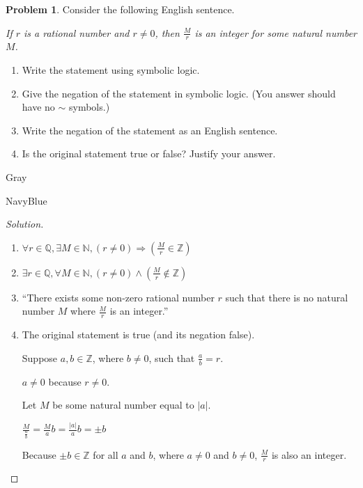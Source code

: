 \documentclass[12pt]{amsart}
\newcounter{problem_number}[section]
\theoremstyle{named}
\newenvironment{soln}
{\begin{color}{Gray}\begin{framed}\begin{color}{NavyBlue}\begin{proof}[Solution]
\doublespacing}
{\end{proof}\end{color}\end{framed}\end{color}}
\theoremstyle{definition}
\newtheorem{problem}{Problem}
\begin{document}
\vspace*{1em}

\begin{problem}
	Consider the following English sentence.
\begin{center}
	\emph{If $r$ is a rational number and $r\not=0$, then $\frac{M}{r}$ is an integer for some natural number $M$.}
\end{center}

	\begin{enumerate}
		\item Write the statement using symbolic logic.
		\item Give the negation of the statement in symbolic logic. (You answer should have no $\sim$ symbols.)
		\item Write the negation of the statement as an English sentence.
		\item Is the original statement true or false? Justify your answer.
	\end{enumerate}
\end{problem}

\begin{soln}
	\phantom{ }
	\begin{enumerate}
		\item $\forall r \in \mathbb Q,\exists M \in \mathbb N,
		(r \neq 0) \Rightarrow  (\frac{M}{r} \in \mathbb Z)$

		\item $\exists r \in \mathbb Q, \forall M \in \mathbb N, (r \neq 0)
		\land (\frac{M}{r} \notin \mathbb Z)$

		\item ``There exists some non-zero rational number $r$ such that there is no
		natural number $M$ where $\frac{M}{r}$ is an integer.''

		\item The original statement is true (and its negation false). 
		
		
		

		\noindent Suppose $a,b \in \mathbb Z$, where $b \neq 0$, such that $\frac{a}{b} = r$.

		\noindent $a \neq 0$ because $r \neq 0$.

		\noindent Let $M$ be some natural number equal to $|a|$.
		
		\noindent $\frac{M}{\frac{a}{b}} = \frac{M}{a}b = \frac{|a|}{a}b = \pm b$

		\noindent Because $\pm b \in \mathbb Z$ for all $a$ and $b$, where $a \neq 0$
		and $b \neq 0$, $\frac{M}{r}$ is also an integer.  
	\end{enumerate}
\end{soln}


\end{document}
